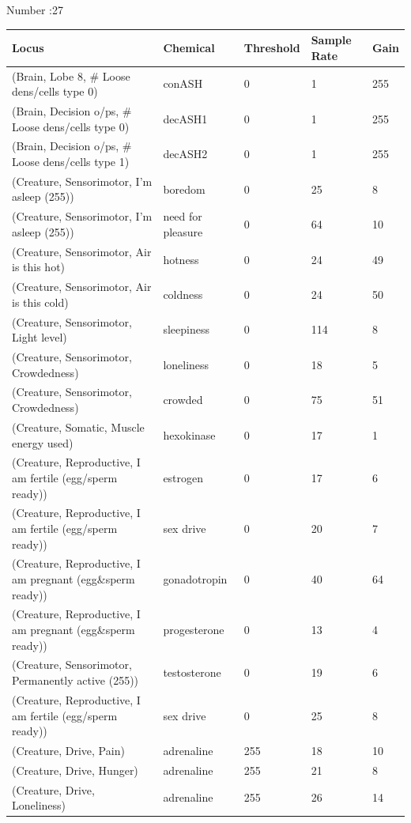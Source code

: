 \documentclass{article}
\begin{document}
Number :27

\begin{longtable}{|p{7cm}|p{3cm}|p{2cm}|p{2cm}|p{2cm}|}
\hline
{\bf Locus} & {\bf Chemical} & {\bf Threshold} & {\bf Sample Rate} & {\bf Gain} \\ \hline
(Brain, Lobe 8, \# Loose dens/cells type 0) & conASH & 0 & 1 & 255 \\ \hline
(Brain, Decision o/ps, \# Loose dens/cells type 0) & decASH1 & 0 & 1 & 255 \\ \hline
(Brain, Decision o/ps, \# Loose dens/cells type 1) & decASH2 & 0 & 1 & 255 \\ \hline
(Creature, Sensorimotor, I'm asleep (255)) & boredom & 0 & 25 & 8 \\ \hline
(Creature, Sensorimotor, I'm asleep (255)) & need for pleasure & 0 & 64 & 10 \\ \hline
(Creature, Sensorimotor, Air is this hot) & hotness & 0 & 24 & 49 \\ \hline
(Creature, Sensorimotor, Air is this cold) & coldness & 0 & 24 & 50 \\ \hline
(Creature, Sensorimotor, Light level) & sleepiness & 0 & 114 & 8 \\ \hline
(Creature, Sensorimotor, Crowdedness) & loneliness & 0 & 18 & 5 \\ \hline
(Creature, Sensorimotor, Crowdedness) & crowded & 0 & 75 & 51 \\ \hline
(Creature, Somatic, Muscle energy used) & hexokinase & 0 & 17 & 1 \\ \hline
(Creature, Reproductive, I am fertile (egg/sperm ready)) & estrogen & 0 & 17 & 6 \\ \hline
(Creature, Reproductive, I am fertile (egg/sperm ready)) & sex drive & 0 & 20 & 7 \\ \hline
(Creature, Reproductive, I am pregnant (egg\&sperm ready)) & gonadotropin & 0 & 40 & 64 \\ \hline
(Creature, Reproductive, I am pregnant (egg\&sperm ready)) & progesterone & 0 & 13 & 4 \\ \hline
(Creature, Sensorimotor, Permanently active (255)) & testosterone & 0 & 19 & 6 \\ \hline
(Creature, Reproductive, I am fertile (egg/sperm ready)) & sex drive & 0 & 25 & 8 \\ \hline
(Creature, Drive, Pain) & adrenaline & 255 & 18 & 10 \\ \hline
(Creature, Drive, Hunger) & adrenaline & 255 & 21 & 8 \\ \hline
(Creature, Drive, Loneliness) & adrenaline & 255 & 26 & 14 \\ \hline

\end{longtable}
\end{document}
